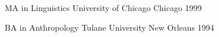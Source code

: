 


\cventryshort
{MA in Linguistics} %
{University of Chicago} %
{Chicago} %
{1999} %

\cventryshort
{BA in Anthropology}
{Tulane University}
{New Orleans}
{1994}

